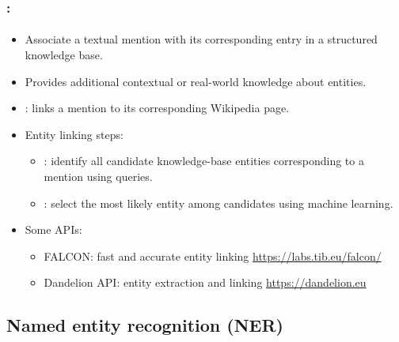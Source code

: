 \documentclass[xcolor=table]{beamer}
\begin{document}
\begin{frame}
	\frametitle{\insertshortsubtitle: \insertsection}
	\framesubtitle{\insertsubsection}
	
	\begin{itemize}
		\item Associate a textual mention with its corresponding entry in a structured knowledge base.
		
		\item Provides additional contextual or real-world knowledge about entities.
		
		\item {}: links a mention to its corresponding Wikipedia page.
		
		\item Entity linking steps: 
		\begin{itemize}
			\item {}: identify all candidate knowledge-base entities corresponding to a mention using queries.
			\item {}: select the most likely entity among candidates using machine learning.
		\end{itemize}
		
		\item Some APIs:
		\begin{itemize}
			\item FALCON: fast and accurate entity linking \url{https://labs.tib.eu/falcon/} 
			\item Dandelion API: entity extraction and linking \url{https://dandelion.eu}
		\end{itemize}
		
	\end{itemize}
	
\end{frame}

\subsection{Named entity recognition (NER)}
\end{document}
